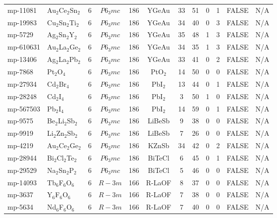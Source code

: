 {\begin{longtable}{llcccccccccc}
    mp-11081 & Au$_{2}$Ce$_{2}$Sn$_{2}$ & 6     & $P6_3mc$ & 186   & YGeAu & 33    & 51    & 0     & 1     & FALSE & N/A \\
    mp-19983 & Cu$_{2}$Sn$_{2}$Ti$_{2}$ & 6     & $P6_3mc$ & 186   & YGeAu & 34    & 40    & 0     & 3     & FALSE & N/A \\
    mp-5729 & Ag$_{2}$Sn$_{2}$Y$_{2}$ & 6     & $P6_3mc$ & 186   & YGeAu & 35    & 48    & 1     & 3     & FALSE & N/A \\
    mp-610631 & Au$_{2}$La$_{2}$Ge$_{2}$ & 6     & $P6_3mc$ & 186   & YGeAu & 34    & 35    & 1     & 3     & FALSE & N/A \\
    mp-13406 & Ag$_{2}$La$_{2}$Pb$_{2}$ & 6     & $P6_3mc$ & 186   & YGeAu & 33    & 41    & 0     & 2     & FALSE & N/A \\
    mp-7868 & Pt$_{2}$O$_{4}$ & 6     & $P6_3mc$ & 186   & PtO$_{2}$ & 14    & 50    & 0     & 0     & FALSE & N/A \\
    mp-27934 & Cd$_{2}$Br$_{4}$ & 6     & $P6_3mc$ & 186   & PbI$_{2}$ & 13    & 44    & 0     & 1     & FALSE & N/A \\
    mp-28248 & Cd$_{2}$I$_{4}$ & 6     & $P6_3mc$ & 186   & PbI$_{2}$ & 3     & 50    & 1     & 0     & FALSE & N/A \\
    mp-567503 & Pb$_{2}$I$_{4}$ & 6     & $P6_3mc$ & 186   & PbI$_{2}$ & 14    & 59    & 0     & 1     & FALSE & N/A \\
    mp-9575 & Be$_{2}$Li$_{2}$Sb$_{2}$ & 6     & $P6_3mc$ & 186   & LiBeSb & 9     & 38    & 0     & 0     & FALSE & N/A \\
    mp-9919 & Li$_{2}$Zn$_{2}$Sb$_{2}$ & 6     & $P6_3mc$ & 186   & LiBeSb & 7     & 26    & 0     & 0     & FALSE & N/A \\
    mp-4219 & Au$_{2}$Ce$_{2}$Ge$_{2}$ & 6     & $P6_3mc$ & 186   & KZnSb & 34    & 42    & 0     & 2     & FALSE & N/A \\
    mp-28944 & Bi$_{2}$Cl$_{2}$Te$_{2}$ & 6     & $P6_3mc$ & 186   & BiTeCl & 6     & 45    & 0     & 1     & FALSE & N/A \\
    mp-29529 & Na$_{2}$Sn$_{2}$P$_{2}$ & 6     & $P6_3mc$ & 186   & BiTeCl & 5     & 46    & 0     & 0     & FALSE & N/A \\
    mp-14093 & Tb$_{6}$F$_{6}$O$_{6}$ & 6     & $R-3m$ & 166   & R-LaOF & 8     & 37    & 0     & 0     & FALSE & N/A \\
    mp-3637 & Y$_{6}$F$_{6}$O$_{6}$ & 6     & $R-3m$ & 166   & R-LaOF & 7     & 38    & 0     & 0     & FALSE & N/A \\
    mp-5634 & Nd$_{6}$F$_{6}$O$_{6}$ & 6     & $R-3m$ & 166   & R-LaOF & 7     & 40    & 0     & 0     & FALSE & N/A \\

\end{longtable}}
